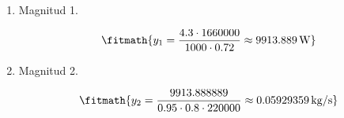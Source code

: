 \begin{enumerate}

\item Magnitud 1.

\[\fitmath{y_{1}=\frac{4.3\cdot 1660000}{1000\cdot 0.72}\approx 9913.889\,\mathrm{W}}\]

\item Magnitud 2.

\[\fitmath{y_{2}=\frac{9913.888889}{0.95\cdot 0.8\cdot 220000}\approx 0.05929359\,\mathrm{kg/s}}\]

\end{enumerate}
